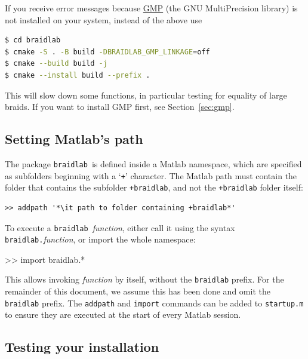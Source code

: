 \documentclass[12pt]{article}
\newcommand{\braidlab}{\texttt{braidlab}}%
\begin{document}
%
If you receive error messages because \href{https://gmplib.org/}{GMP} (the GNU
MultiPrecision library) is not installed on your system, instead of the above
use
\begin{lstlisting}[frame=single,framerule=0pt,escapechar=*,%
  language=bash,backgroundcolor=\color{white}]
$ cd braidlab
$ cmake -S . -B build -DBRAIDLAB_GMP_LINKAGE=off
$ cmake --build build -j
$ cmake --install build --prefix .
\end{lstlisting}
This will slow down some functions, in particular testing for equality of
large braids.  If you want to install GMP first, see Section~\ref{sec:gmp}.

%


\subsection{Setting Matlab's path}
\label{sec:path}

\lstset{language=Matlab}
\lstset{breaklines=true}

The package \braidlab\ is defined inside a Matlab namespace,
 which are specified as subfolders beginning with a
`\lstinline{+}' character.  The Matlab path  must contain
the folder that contains the subfolder \lstinline{+braidlab}, and not the
\lstinline{+braidlab} folder itself:
\begin{lstlisting}[frame=single,framerule=0pt,escapechar=*]
>> addpath '*\it path to folder containing +braidlab*'
\end{lstlisting}
To execute a \braidlab\ \textit{function}, either call it using the syntax
\hbox{\lstinline{braidlab.}\textit{function}}, or import the whole namespace:
\begin{lstbraidlab}
>> import braidlab.*
\end{lstbraidlab}
This allows invoking \textit{function} by itself, without the
\lstinline{braidlab} prefix.  For the remainder of this document, we
assume this has been done and omit the \lstinline{braidlab} prefix.
The \lstinline{addpath} and \lstinline{import} commands can be added
to \lstinline{startup.m} to ensure they are executed at the start of
every Matlab session.


\subsection{Testing your installation}
\end{document}
